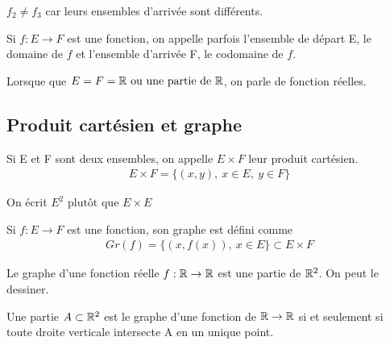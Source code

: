 \begin{remarque}
	$f_2 \neq f_3$ car leurs ensembles d'arrivée sont différents.
\end{remarque}

\begin{remarque}[Vocabulaire]
	Si $f : E \to F$ est une fonction, on appelle parfois l'ensemble de départ E, le domaine de $f$ et l'ensemble d'arrivée F, le codomaine de $f$.
\end{remarque}

\begin{remarque}
	Lorsque que $E = F = \mathbb{R} \textnormal{ ou une partie de } \mathbb{R}$, on parle de fonction réelles. 
\end{remarque}


\subsection{Produit cartésien et graphe}

\begin{graybox}
	\begin{definition}
		Si E et F sont deux ensembles, on appelle $E \times F$ leur produit cartésien.
		\begin{align*}
			E \times F = \{(x, y),\ x \in E,\ y \in F\}
		\end{align*}
	\end{definition}
\end{graybox}

\begin{remarque}
	On écrit $E^2 \text{ plutôt que } E \times E$
\end{remarque}

\begin{graybox}
	\begin{definition}
		Si $f : E \to F$ est une fonction, son graphe est défini comme 
		\begin{align*}
			Gr(f) = \{(x, f(x)),\ x \in E\} \subset E \times F
		\end{align*}
	\end{definition}
\end{graybox}

\begin{remarque}
	Le graphe d'une fonction réelle $f : \mathbb{R} \to \mathbb{R}$ est une partie de $\mathbb{R}^2$. On peut le dessiner.
\end{remarque}

\begin{remarque}
	Une partie $A \subset \mathbb{R}^2$ est le graphe d'une fonction de $\mathbb{R} \to \mathbb{R}$ si et seulement si toute droite verticale intersecte A en un unique point.
\end{remarque}



